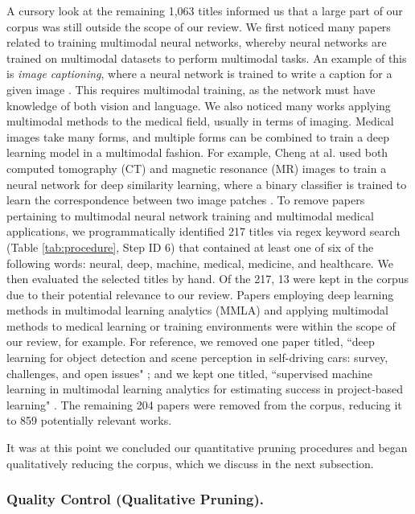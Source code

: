 \documentclass[manuscript,screen,review]{acmart}
\begin{document}
A cursory look at the remaining 1,063 titles informed us that a large part of our corpus was still outside the scope of our review. We first noticed many papers related to training multimodal neural networks, whereby neural networks are trained on multimodal datasets to perform multimodal tasks. An example of this is \textit{image captioning}, where a neural network is trained to write a caption for a given image \cite{yu2019multimodal}. This requires multimodal training, as the network must have knowledge of both vision and language. We also noticed many works applying multimodal methods to the medical field, usually in terms of imaging. Medical images take many forms, and multiple forms can be combined to train a deep learning model in a multimodal fashion. For example, Cheng at al. used both computed tomography (CT) and magnetic resonance (MR) images to train a neural network for deep similarity learning, where a binary classifier is trained to learn the correspondence between two image patches \cite{cheng2018deep}. To remove papers pertaining to multimodal neural network training and multimodal medical applications, we programmatically identified 217 titles via regex keyword search (Table \ref{tab:procedure}, Step ID 6) that contained at least one of six of the following words: neural, deep, machine, medical, medicine, and healthcare. We then evaluated the selected titles by hand. Of the 217, 13 were kept in the corpus due to their potential relevance to our review. Papers employing deep learning methods in multimodal learning analytics (MMLA) and applying multimodal methods to medical learning or training environments were within the scope of our review, for example. For reference, we removed one paper titled, ``deep learning for object detection and scene perception in self-driving cars: survey, challenges, and open issues" \cite{gupta2021deep}; and we kept one titled, ``supervised machine learning in multimodal learning analytics for estimating success in project‐based learning" \cite{spikol2018supervised}. The remaining 204 papers were removed from the corpus, reducing it to 859 potentially relevant works.

It was at this point we concluded our quantitative pruning procedures and began qualitatively reducing the corpus, which we discuss in the next subsection.

\subsubsection{Quality Control (Qualitative Pruning).} \label{subsubsec:quality_control}
\end{document}

